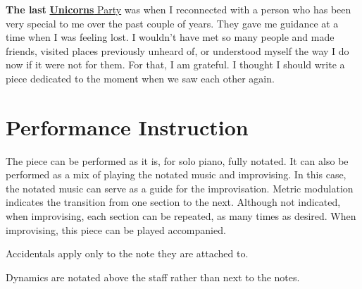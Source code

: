 \documentclass{article}
\begin{document}
\textbf{The last}
\href{https://www.unicornsparty.com/}{\textbf{Unicorns} Party} was when
I reconnected with a person who has been very special to me over the
past couple of years. They gave me guidance at a time when I was feeling
lost. I wouldn't have met so many people and made friends, visited
places previously unheard of, or understood myself the way I do now if
it were not for them. For that, I am grateful. I thought I should write
a piece dedicated to the moment when we saw each other again.

\section*{Performance Instruction}
The piece can be performed as it is, for solo piano, fully notated.
%
It can also be performed as a mix of playing the notated music and
improvising.
%
In this case, the notated music can serve as a guide for the
improvisation.
%
Metric modulation indicates the transition from one section to the next.
Although not indicated, when improvising, each section can be repeated,
as many times as desired.
%
When improvising, this piece can be played accompanied.

\noindent
Accidentals apply only to the note they are attached to.

\noindent
Dynamics are notated above the staff rather than next to the notes.
\end{document}
